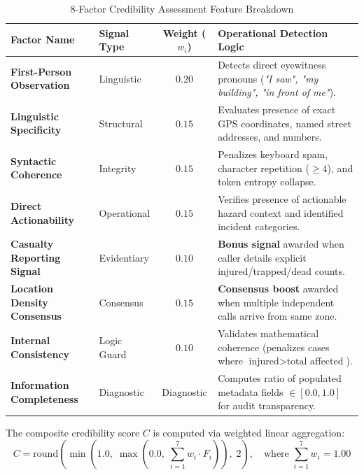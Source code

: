 \documentclass[10pt,a4paper]{article}
\begin{document}
\begin{table}[htbp]
  \centering
  \small
  \caption{8-Factor Credibility Assessment Feature Breakdown}
  \label{tab:credibility_factors}
  \begin{tabularx}{\textwidth}{llcX}
    \toprule
    \textbf{Factor Name} & \textbf{Signal Type} & \textbf{Weight ($w_i$)} & \textbf{Operational Detection Logic} \\
    \midrule
    \textbf{First-Person Observation} & Linguistic & $0.20$ & Detects direct eyewitness pronouns (\emph{"I saw", "my building", "in front of me"}). \\
    \textbf{Linguistic Specificity} & Structural & $0.15$ & Evaluates presence of exact GPS coordinates, named street addresses, and numbers. \\
    \textbf{Syntactic Coherence} & Integrity & $0.15$ & Penalizes keyboard spam, character repetition ($\ge 4$), and token entropy collapse. \\
    \textbf{Direct Actionability} & Operational & $0.15$ & Verifies presence of actionable hazard context and identified incident categories. \\
    \textbf{Casualty Reporting Signal} & Evidentiary & $0.10$ & \textbf{Bonus signal} awarded when caller details explicit injured/trapped/dead counts. \\
    \textbf{Location Density Consensus}& Consensus & $0.15$ & \textbf{Consensus boost} awarded when multiple independent calls arrive from same zone. \\
    \textbf{Internal Consistency} & Logic Guard & $0.10$ & Validates mathematical coherence (penalizes cases where $\text{injured} > \text{total affected}$). \\
    \textbf{Information Completeness} & Diagnostic & Diagnostic & Computes ratio of populated metadata fields $\in [0.0, 1.0]$ for audit transparency. \\
    \bottomrule
  \end{tabularx}
\end{table}

The composite credibility score $C$ is computed via weighted linear aggregation:
\begin{equation}
  C = \mathrm{round}\left(\min\left(1.0, \; \max\left(0.0, \; \sum_{i=1}^{7} w_i \cdot F_i\right)\right), \; 2\right), \quad \text{where } \sum_{i=1}^{7} w_i = 1.00
\end{equation}
\end{document}
